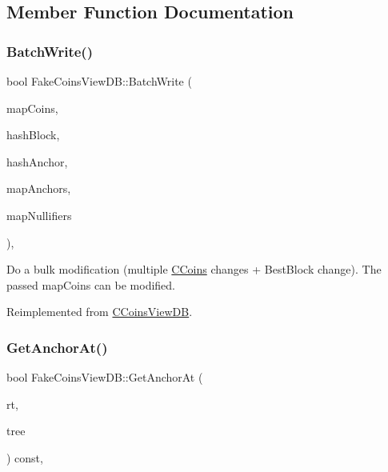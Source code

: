 \subsection{Member Function Documentation}
\mbox{\label{class_fake_coins_view_d_b_a1108b45f9d165344c7378051e061147b}} 
\subsubsection{\texorpdfstring{Batch\+Write()}{BatchWrite()}}
{\footnotesize\ttfamily bool Fake\+Coins\+View\+D\+B\+::\+Batch\+Write (\begin{DoxyParamCaption}\item[{\mbox{\hyperlink{coins_8h_a2886ba2fd0428bae777e1cbcabc02834}{C\+Coins\+Map}} \&}]{map\+Coins,  }\item[{const \mbox{\hyperlink{classuint256}{uint256}} \&}]{hash\+Block,  }\item[{const \mbox{\hyperlink{classuint256}{uint256}} \&}]{hash\+Anchor,  }\item[{\mbox{\hyperlink{coins_8h_a070827cc9d21a91b8f4f4f52a6f7c848}{C\+Anchors\+Map}} \&}]{map\+Anchors,  }\item[{\mbox{\hyperlink{coins_8h_ab651cc287e9594190ef77d2fca2b14c7}{C\+Nullifiers\+Map}} \&}]{map\+Nullifiers }\end{DoxyParamCaption})\hspace{0.3cm}{\ttfamily [inline]}, {\ttfamily [virtual]}}

Do a bulk modification (multiple \mbox{\hyperlink{class_c_coins}{C\+Coins}} changes + Best\+Block change). The passed map\+Coins can be modified. 

Reimplemented from \mbox{\hyperlink{class_c_coins_view_d_b_ab617e4b898f06cec79a2a26fdca9efbd}{C\+Coins\+View\+DB}}.

\mbox{\label{class_fake_coins_view_d_b_ae52d0073bef3eb64bd64b325e821c52b}} 
\subsubsection{\texorpdfstring{Get\+Anchor\+At()}{GetAnchorAt()}}
{\footnotesize\ttfamily bool Fake\+Coins\+View\+D\+B\+::\+Get\+Anchor\+At (\begin{DoxyParamCaption}\item[{const \mbox{\hyperlink{classuint256}{uint256}} \&}]{rt,  }\item[{Z\+C\+Incremental\+Merkle\+Tree \&}]{tree }\end{DoxyParamCaption}) const\hspace{0.3cm}{\ttfamily [inline]}, {\ttfamily [virtual]}}



